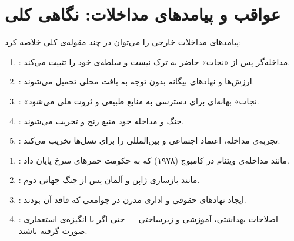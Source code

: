 \section{عواقب و پیامدهای مداخلات: نگاهی کلی}
\label{sec:ch01-consequences}

پیامدهای مداخلات خارجی را می‌توان در چند مقوله‌ی کلی خلاصه کرد:

\begin{tcolorbox}[enemybox, title={\rl{پیامدهای بالقوه‌ی منفی}}]
\begin{enumerate}[label=\textbf{\arabic*.}, nosep, rightmargin=1em]
  \item {}: مداخله‌گر پس از «نجات» حاضر به
    ترک نیست و سلطه‌ی خود را تثبیت
    می‌کند.
  \item {}: ارزش‌ها و نهادهای بیگانه بدون
    توجه به بافت محلی تحمیل
    می‌شوند.
  \item {}: «نجات» بهانه‌ای برای دسترسی به منابع
    طبیعی و ثروت ملی می‌شود.
  \item {}: جنگ و مداخله خود منبع رنج
    و تخریب می‌شوند.
  \item {}: تجربه‌ی مداخله، اعتماد اجتماعی و
    بین‌المللی را برای نسل‌ها تخریب
    می‌کند.
\end{enumerate}
\end{tcolorbox}

\begin{tcolorbox}[wavebox, title={\rl{پیامدهای بالقوه‌ی مثبت}}]
\begin{enumerate}[label=\textbf{\arabic*.}, nosep, rightmargin=1em]
  \item {}: مانند مداخله‌ی
    ویتنام در کامبوج (۱۹۷۸) که به حکومت خمرهای سرخ پایان داد.
  \item {}: مانند بازسازی ژاپن و آلمان
    پس از جنگ جهانی دوم.
  \item {}: ایجاد نهادهای حقوقی و اداری مدرن
    در جوامعی که فاقد آن بودند.
  \item {}: اصلاحات بهداشتی، آموزشی و
    زیرساختی --- حتی اگر با انگیزه‌ی استعماری صورت گرفته باشند.
\end{enumerate}
\end{tcolorbox}


